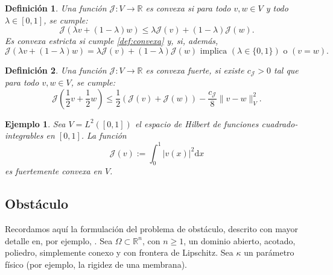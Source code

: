 \documentclass[12pt]{book}
\newtheorem{definition}{Definición}
\newtheorem{ex}{Ejemplo}
\theoremstyle{definition}
\theoremstyle{plain}
\theoremstyle{remark}
\begin{document}

\begin{definition}
Una función $\mathcal{J}: V \to \mathbb{R}$ 
es \emph{convexa} si para todo $v, w \in V$ y todo $\lambda \in [0, 1]$, se cumple:
\begin{equation}
    \label{def:convexa}
\mathcal{J}(\lambda v + (1 - \lambda) w) \leq \lambda \mathcal{J}(v) + (1 - \lambda) \mathcal{J}(w).
\end{equation}
Es convexa estricta si cumple \eqref{def:convexa} y, si, además, 
\begin{equation}
    \label{def:convexaestricta}
\mathcal{J}(\lambda v + (1 - \lambda) w) = \lambda \mathcal{J}(v) + (1 - \lambda) \mathcal{J}(w) \textrm{ implica } (\lambda \in \{0,1\}) \textrm{ o } (v=w).
\end{equation}
\end{definition}

\begin{definition}
Una función $\mathcal{J}: V \to \mathbb{R}$ 
es \emph{convexa} fuerte, si existe $c_\mathcal{J} > 0$ tal que para todo $v,w \in V$, se cumple:
\begin{equation}
    \label{def:convexafuerte}
\mathcal{J}
\left( \frac12 v + \frac12 w \right) \leq 
 \frac12 \left (\mathcal{J}(v)+\mathcal{J}(w)\right) - \frac{c_\mathcal{J}}{8} \| v-w \|_V^2.
\end{equation}
\end{definition}

\begin{ex}
Sea $V = L^2([0,1])$ el espacio de Hilbert de funciones cuadrado-integrables en $[0,1]$.
La función \[
\mathcal{J}(v) := \int_0^1 |v(x)|^2  \mathrm{d}x\] es fuertemente convexa en $V$.
\end{ex}

\subsection{Obstáculo}
Recordamos aquí la formulación del problema de obstáculo, 
descrito con mayor detalle en, por ejemplo, %
\cite{gustafsson2024adaptive}.
%
Sea \(\Omega \subset \mathbb{R}^{n}\), con \(n \geq 1\), un dominio abierto, acotado, poliedro, simplemente conexo y con frontera de Lipschitz. Sea \(\kappa\) un parámetro físico (por ejemplo, la rigidez de una membrana).
\end{document}

